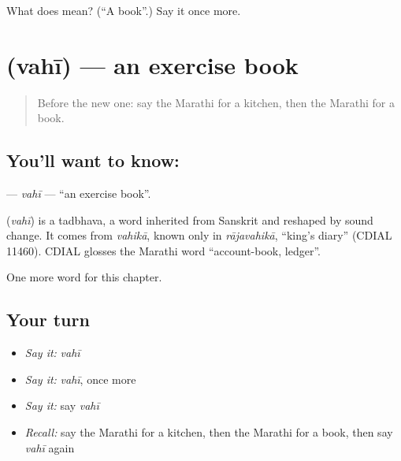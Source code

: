 \begin{tcolorbox}[breakable,colback=teal!4,colframe=teal!35!black,title={Before you move on}]
What does  mean? (\textquotedblleft{}A book\textquotedblright{}.) Say it once more.
\end{tcolorbox}
\section[\texorpdfstring{\mr{वही} (vahī)}{वही (vahī)}]{ (vahī) — an exercise book}

\label{lesson:MR-C93-vahi}



\begin{quote}
Before the new one: say the Marathi for a kitchen, then the Marathi for a book.
\end{quote}

\subsection*{You'll want to know: }
\textbf{} — \emph{vahī} — \textquotedblleft{}an exercise book\textquotedblright{}.

\begin{cousinweb}
\textbf{} (\emph{vahī}) is a tadbhava, a word inherited from Sanskrit and reshaped by sound change. It comes from \emph{vahikā}, known only in \emph{rājavahikā}, \textquotedblleft{}king's diary\textquotedblright{} (CDIAL 11460). CDIAL glosses the Marathi word \textquotedblleft{}account-book, ledger\textquotedblright{}.
\end{cousinweb}

\begin{grammarlens}[title={What you've built}]
One more word for this chapter.
\end{grammarlens}

\subsection*{Your turn}
\begin{itemize}
\raggedright
  \item \emph{Say it:} \emph{vahī}
  \item \emph{Say it:} \emph{vahī}, once more
  \item \emph{Say it:} say \emph{vahī}
  \item \emph{Recall:} say the Marathi for a kitchen, then the Marathi for a book, then say \emph{vahī} again
\end{itemize}

